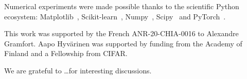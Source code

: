 
Numerical experiments were made possible thanks to the 
scientific Python ecosystem: 
Matplotlib~\citep{matplotlib}, 
Scikit-learn~\citep{scikit-learn}, 
Numpy~\citep{numpy}, 
Scipy~\citep{scipy} and PyTorch~\citep{pytorch}.


This work was supported by the French ANR-20-CHIA-0016 to Alexandre Gramfort. Aapo Hyv\"arinen was supported by funding from the Academy of Finland and a Fellowship from CIFAR.

We are grateful to \ldots for interesting discussions.